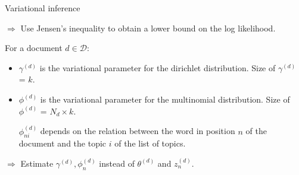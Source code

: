 \documentclass[final]{beamer}
\newlength{\onecolwid}
\newlength{\twocolwid}
\begin{document}
\begin{frame}[t]
\begin{columns}[t]
\begin{column}{\twocolwid}





\begin{columns}[t,totalwidth=\twocolwid] %

\begin{column}{\onecolwid} %


\begin{block}{Variational inference}

$\Rightarrow$ Use Jensen's inequality to obtain a lower bound on the log likelihood.

For a document $d \in \mathcal{D}$:
 \begin{itemize}
  \item $\gamma^{(d)}$ is the variational parameter for the dirichlet distribution. Size of $\gamma^{(d)}$ = $k$.
  \item $\phi^{(d)}$ is the variational parameter for the multinomial distribution. Size of $\phi^{(d)}$ = $N_d \times k$.
  
  $\phi_{ni}^{(d)}$ depends on the relation between the word in position $n$ of the document and the topic $i$ of the list of topics.
   \end{itemize}

$\Rightarrow$ Estimate $\gamma^{(d)}, \phi_{n}^{(d)}$ instead of $\theta^{(d)}$ and $z_n^{(d)}$.


\end{block}
\end{column}
\end{columns}
\end{column}
\end{columns}
\end{frame}
\end{document}
